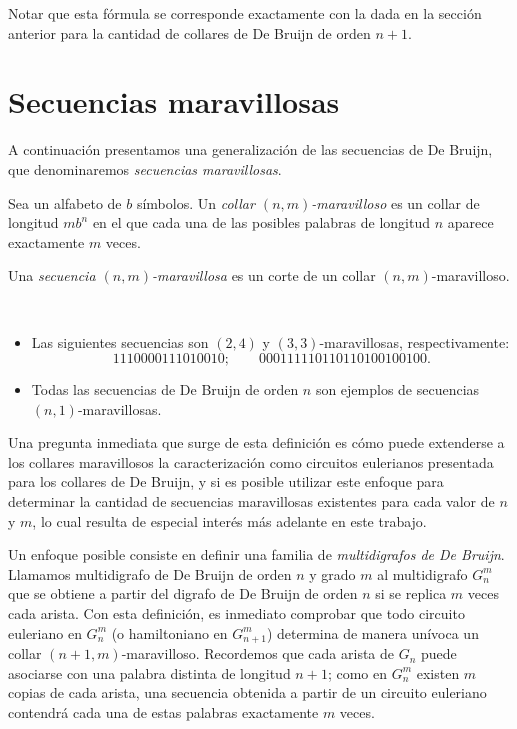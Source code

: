 Notar que esta fórmula se corresponde exactamente con la dada en la sección
anterior para la cantidad de collares de De Bruijn de orden $n + 1$.

\section{Secuencias maravillosas}

A continuación presentamos una generalización de las secuencias de De Bruijn,
que denominaremos \emph{secuencias maravillosas}.

\begin{definition}
Sea un alfabeto de $b$ símbolos.
Un \emph{collar $(n,m)$-maravilloso} es un collar de longitud $mb^n$
en el que cada una de las posibles palabras de longitud $n$ aparece
exactamente $m$ veces.

Una \emph{secuencia $(n,m)$-maravillosa} es un corte de un collar
$(n,m)$-maravilloso.
\end{definition}

\begin{examples}\ %
	\begin{itemize}
		\item Las siguientes secuencias son $(2,4)$ y $(3,3)$-maravillosas, respectivamente:
		\[ 1110000111010010; \qquad 000111110110110100100100. \]
		\item Todas las secuencias de De Bruijn de orden $n$ son ejemplos de secuencias
		$(n,1)$-maravillosas.
	\end{itemize}
\end{examples}

Una pregunta inmediata que surge de esta definición es cómo puede extenderse a
los collares maravillosos la caracterización como circuitos eulerianos
presentada para los collares de De Bruijn, y si es posible utilizar este enfoque
para determinar la cantidad de secuencias maravillosas existentes para cada valor
de $n$ y $m$, lo cual resulta de especial interés más adelante en este
trabajo.

Un enfoque posible consiste en definir una familia de \emph{multidigrafos de De
	Bruijn}.
Llamamos multidigrafo de De Bruijn de orden $n$ y grado $m$ al multidigrafo
$G_n^m$ que se obtiene a partir del digrafo de De Bruijn de orden $n$ si se
replica $m$ veces cada arista.
Con esta definición, es inmediato comprobar que todo circuito euleriano en
$G_n^m$ (o hamiltoniano en $G_{n+1}^m$) determina de manera unívoca un collar
$(n+1, m)$-maravilloso.
Recordemos que cada arista de $G_n$ puede asociarse con una palabra distinta de
longitud $n+1$; como en $G_n^m$ existen $m$ copias de cada arista, una
secuencia obtenida a partir de un circuito euleriano contendrá cada una de
estas palabras exactamente $m$ veces.


